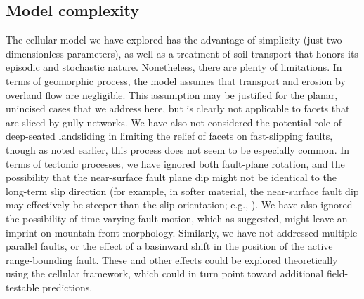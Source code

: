 \subsection{Model complexity}

The cellular model we have explored has the advantage of simplicity (just two dimensionless parameters), as well as a treatment of soil transport that honors its episodic and stochastic nature. Nonetheless, there are plenty of limitations. In terms of geomorphic process, the model assumes that transport and erosion by overland flow are negligible. This assumption may be justified for the planar, unincised cases that we address here, but is clearly not applicable to facets that are sliced by gully networks. We have also not considered the potential role of deep-seated landsliding in limiting the relief of facets on fast-slipping faults, though as noted earlier, this process does not seem to be especially common. In terms of tectonic processes, we have ignored both fault-plane rotation, and the possibility that the near-surface fault plane dip might not be identical to the long-term slip direction (for example, in softer material, the near-surface fault dip may effectively be steeper than the slip orientation; e.g., \citet{mccalpin2009paleoseismology}). We have also ignored the possibility of time-varying fault motion, which as \citet{hamblin1976patterns} suggested, might leave an imprint on mountain-front morphology. Similarly, we have not addressed multiple parallel faults, or the effect of a basinward shift in the position of the active range-bounding fault. These and other effects could be explored theoretically using the cellular framework, which could in turn point toward additional field-testable predictions.




